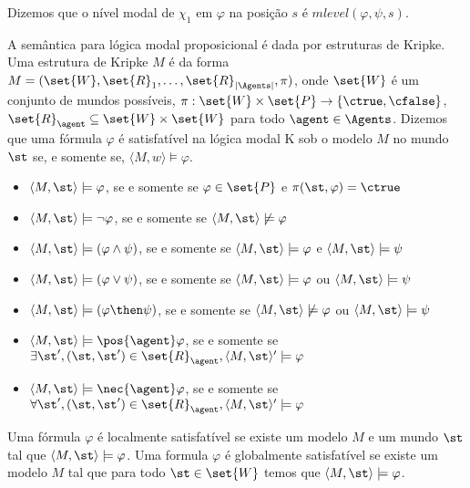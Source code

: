 Dizemos que o nível modal de $\chi_1$ em $\varphi$ na posição $s$ é $mlevel(\varphi, \psi, s)$.

A semântica para lógica modal proposicional é dada por estruturas de Kripke. Uma estrutura de Kripke $M$ é da forma $M = (\set{W}, \set{R}_1, \ldots, \set{R}_{|\Agents|}, \pi)$, onde %
$\set{W}$ é um conjunto de mundos possíveis, $\pi:\set{W} \times \set{P} \rightarrow \{\ctrue, \cfalse\}$, $\set{R}_\agent \subseteq \set{W} \times \set{W}$ para todo $\agent \in \Agents$. Dizemos que uma fórmula $\varphi$ é satisfatível na lógica modal K sob o modelo $M$ no mundo $\st$ se, e somente se, $\langle M,w \rangle \models \varphi$.

\begin{itemize}
	\item $\langle M,\st \rangle \models \varphi$, se e somente se $\varphi \in \set{P}$ e $\pi(\st, \varphi) = \ctrue$
	\item $\langle M,\st \rangle \models \neg\varphi$, se e somente se $\langle M,\st \rangle \not\models \varphi$
	\item $\langle M,\st \rangle \models (\varphi \land \psi)$, se e somente se $\langle M,\st \rangle \models \varphi$ e $\langle M,\st \rangle \models \psi $
	\item $\langle M,\st \rangle \models (\varphi \lor \psi)$, se e somente se $\langle M,\st \rangle \models \varphi$ ou $\langle M,\st \rangle \models \psi $
	\item $\langle M,\st \rangle \models (\varphi \then \psi)$, se e somente se $\langle M,\st \rangle \not\models \varphi$ ou $\langle M,\st \rangle \models \psi $
	
	\item $\langle M,\st \rangle \models \pos{\agent}\varphi$, se e somente se $\exists\st', (\st, \st') \in \set{R}_\agent, \langle M,\st \rangle' \models \varphi$
	\item $\langle M,\st \rangle \models \nec{\agent}\varphi$, se e somente se $\forall\st', (\st, \st') \in \set{R}_\agent, \langle M,\st \rangle' \models \varphi$
	
\end{itemize}

Uma fórmula $\varphi$ é localmente satisfatível se existe um modelo $M$ e um mundo $\st$ tal que $\langle M,\st \rangle \models \varphi$. Uma formula $\varphi$ é globalmente satisfatível se existe um modelo $M$ tal que para todo $\st \in \set{W}$ temos que $\langle M,\st \rangle \models \varphi$.

